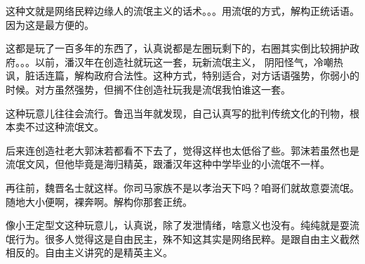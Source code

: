 \begin{zhihuanswer}
这种文就是网络民粹边缘人的流氓主义的话术。。。用流氓的方式，解构正统话语。因为这是最方便的。

这都是玩了一百多年的东西了，认真说都是左圈玩剩下的，右圈其实倒比较拥护政府。。。以前，潘汉年在创造社就玩这一套，玩新流氓主义，
阴阳怪气，冷嘲热讽，脏话连篇，解构政府合法性。这种方式，特别适合，对方话语强势，你弱小的时候。对方虽然强势，但搁不住创造社玩我是流氓我怕谁这一套。

这种玩意儿往往会流行。鲁迅当年就发现，自己认真写的批判传统文化的刊物，根本卖不过这种流氓文。

后来连创造社老大郭沫若都看不下去了，觉得这样也太低俗了些。郭沫若虽然也是流氓文风，但他毕竟是海归精英，跟潘汉年这种中学毕业的小流氓不一样。

再往前，魏晋名士就这样。你司马家族不是以孝治天下吗？咱哥们就故意耍流氓。随地大小便啊，裸奔啊。解构你那套正统。

像小王定型文这种玩意儿，认真说，除了发泄情绪，啥意义也没有。纯纯就是耍流氓行为。很多人觉得这是自由民主，殊不知这其实是网络民粹。是跟自由主义截然相反的。自由主义讲究的是精英主义。
\end{zhihuanswer}
